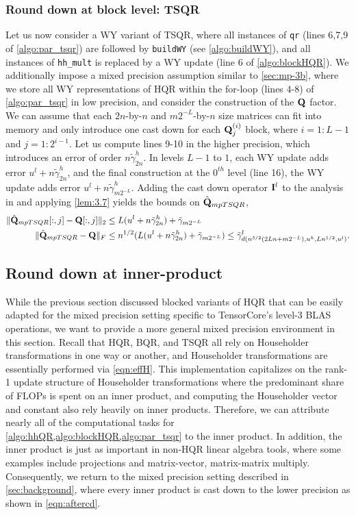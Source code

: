 \subsubsection{Round down at block level: TSQR}\label{sec:mp-3t}
Let us now consider a WY variant of TSQR, where all instances of {\tt qr} (lines 6,7,9 of \cref{algo:par_tsqr}) are followed by {\tt buildWY} (see \cref{algo:buildWY}), and all instances of {\tt hh\_mult} is replaced by a WY update (line 6 of \cref{algo:blockHQR}).
We additionally impose a mixed precision assumption similar to \cref{sec:mp-3b}, where we store all WY representations of HQR within the for-loop (lines 4-8) of \cref{algo:par_tsqr} in low precision, and consider the construction of the $\mathbf{Q}$ factor.
We can assume that each $2n$-by-$n$ and $m2^{-L}$-by-$n$ size matrices can fit into memory and only introduce one cast down for each $\mathbf{Q}_j^{(i)}$ block, where $i=1:L-1$ and $j=1:2^{i-1}$.
Let us compute lines 9-10 in the higher precision, which introduces an error of order $n\tilde{\gamma}_{2n}^h$.
In levels $L-1$ to $1$, each WY update adds error $u^l+n\tilde{\gamma}_{2n}^h$, and the final construction at the $0^{th}$ level (line 16), the WY update adds error $u^l + n\tilde{\gamma}_{m2^{-L}}^h$.
Adding the cast down operator $\mathbf{I}^l$ to the analysis in \cite{Mori2012} and applying \cref{lem:3.7} yields the bounds on $\hat{\mathbf{Q}}_{mpTSQR}$,
\begin{align}
\|\hat{\bb{Q}}_{mpTSQR}[:,j] - \bb{Q}[:,j]\|_2 &\leq L(u^l+n\tilde{\gamma}_{2n}^h)+\tilde{\gamma}_{m2^{-L}}\label{eqn:mpTSQR1}\\%
\|\hat{\bb{Q}}_{mpTSQR} - \bb{Q}\|_F &\leq n^{1/2}(L(u^l+n\tilde{\gamma}_{2n}^h)+\tilde{\gamma}_{m2^{-L}}) \leq \tilde{\gamma}_{d(n^{3/2}(2Ln+m2^{-L}), u^h, Ln^{1/2}, u^l)}^l.\label{eqn:mpTSQR2}
\end{align}

\subsection{Round down at inner-product}\label{sec:mp-2}
While the previous section discussed blocked variants of HQR that can be easily adapted for the mixed precision setting specific to TensorCore's level-3 BLAS operations, we want to provide a more general mixed precision environment in this section.
Recall that HQR, BQR, and TSQR all rely on Householder transformations in one way or another, and Householder transformations are essentially performed via \cref{eqn:effH}.
This implementation capitalizes on the rank-1 update structure of Householder transformations where the predominant share of FLOPs is spent on an inner product, and computing the Householder vector and constant also rely heavily on inner products.
Therefore, we can attribute nearly all of the computational tasks for \cref{algo:hhQR,algo:blockHQR,algo:par_tsqr} to the inner product.
In addition, the inner product is just as important in non-HQR linear algebra tools, where some examples include projections and matrix-vector, matrix-matrix multiply.
Consequently, we return to the mixed precision setting described in \cref{sec:background}, where every inner product is cast down to the lower precision as shown in \cref{eqn:aftercd}.
